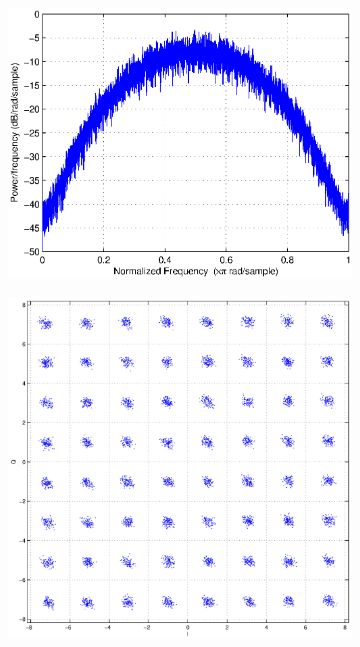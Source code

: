\documentclass[12pt,a4paper,openright]{report}
\begin{document}
 \begin{figure}[H]
 \centering
 \begin{subfigure}[t]{.45\textwidth}
   \centering
       \includegraphics[scale=0.6, trim=1.3cm 0 1cm 0cm, clip=true]{64QAMspectrum.eps}
       \label{fig:qam_spectrum}
 \end{subfigure}%
 \begin{subfigure}[t]{.45\textwidth}
    \centering
     \includegraphics[scale=0.26, trim=14cm 0 12cm 0cm, clip=true]{64QAMscatter.eps}

\end{subfigure}
\end{figure}
\end{document}

